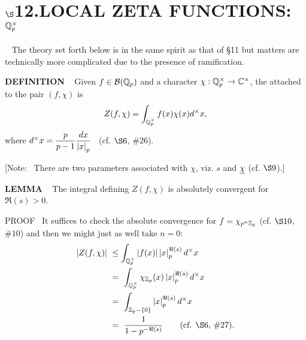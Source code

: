 \chapter{
$\boldsymbol{\S}$\textbf{12}.\quad  LOCAL ZETA FUNCTIONS: $\mathbb{Q}^\times_p$}
\setlength\parindent{2em}
\setcounter{theoremn}{0}

\ \indent 
The theory set forth below is in the same spirit as that of \S11 but matters are technically more complicated due to the presence of ramification.
\vspace{0.1cm}

\begin{x}{\small\bf DEFINITION} \ %
Given $f \in \mathcal{B}(\mathbb{Q}_p)$ and a character $\chi: \mathbb{Q}_p^\times \rightarrow \mathbb{C}^\times$, the 
 
attached to the pair $(f,\chi)$ is
\[
Z(f, \chi) = \int_{\mathbb{Q}_p^\times} f(x) \chi(x) d^\times x,
\]
where $d^\times x = \displaystyle\frac{p}{p-1} \displaystyle\frac{dx}{\left\vert x\right\vert_p}$ \ (cf. $\S 6$, $\#26$).
\end{x}

\vspace{0.1cm}

[Note: \  There are two parameters associated with $\chi$, viz. $s$ and $\underline{\chi}$ (cf. $\S9$).]
\vspace{0.2cm}


\begin{x}{\small\bf LEMMA} \ %
The integral defining $Z(f, \chi)$ is absolutely convergent for $\Re(s) > 0$.

\vspace{0.01cm}

PROOF \   
It suffices to check the absolute convergence for $f = \chi_{p^n \mathbb{Z}_p}$ (cf. $\S 10$, $\#10$) 
and then we might just as well take $n = 0:$
\begin{align*}
\abs{Z(f,\chi)} \ 	
&\le \int_{\Q_p^\times} \abs{f(x)} \abs{x}_p^{\Re(s)} d^\times x\\	
&=\  \int_{\Q_p^\times} \chi_{\Z_p}(x) \abs{x}_p^{\Re(s)} d^\times x\\		
&=\  \int_{\Z_p - \{0\}} \abs{x}_p^{\Re(s)} d^\times x\\	
&=\  \frac{1}{1 - p^{-\Re(s)}} \qquad \text{(cf. $\S 6$, $\#27$)}.
\end{align*}
\end{x}


\vspace{0.1cm}

